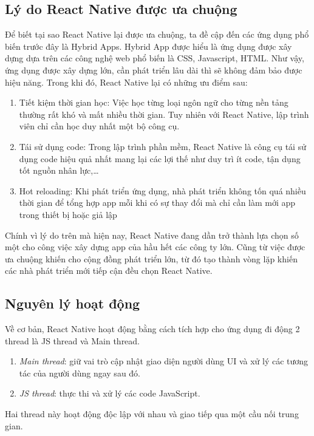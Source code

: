\subsection{Lý do React Native được ưa chuộng}
Để biết tại sao React Native lại được ưa chuộng, ta đề cập đến các ứng dụng phổ biến trước đây là Hybrid Apps. Hybrid App được hiểu là ứng dụng được xây dựng dựa trên các công nghệ web phổ biến là CSS, Javascript, HTML. Như vậy, ứng dụng được xây dựng lớn, cần phát triển lâu dài thì sẽ không đảm bảo được hiệu năng.
\newline
Trong khi đó, React Native lại có những ưu điểm sau:
\begin{enumerate}
    \item {Tiết kiệm thời gian học:} Việc học từng loại ngôn ngữ cho từng nền tảng thường rất khó và mất nhiều thời gian. Tuy nhiên với React Native, lập trình viên chỉ cần học duy nhất một bộ công cụ.
    \item {Tái sử dụng code:} Trong lập trình phần mềm, React Native là công cụ tái sử dụng code hiệu quả nhất mang lại các lợi thế như duy trì ít code, tận dụng tốt nguồn nhân lực,\dots
    \item {Hot reloading:} Khi phát triển ứng dụng, nhà phát triển không tốn quá nhiều thời gian để tổng hợp app mỗi khi có sự thay đổi mà chỉ cần làm mới app trong thiết bị hoặc giả lập
\end{enumerate}
Chính vì lý do trên mà hiện nay, React Native  đang dần trở thành lựa chọn số một cho công việc xây dựng app của hầu hết các công ty lớn. Cũng từ việc được ưa chuộng khiến cho cộng đồng phát triển lớn, từ đó tạo thành vòng lặp khiến các nhà phát triển mới tiếp cận đều chọn React Native.

\subsection{Nguyên lý hoạt động}
Về cơ bản, React Native hoạt động bằng cách tích hợp cho ứng dụng đi động 2 thread là JS thread và Main thread.
\begin{enumerate}
    \item{\textit{Main thread}}: giữ vai trò cập nhật giao diện người dùng UI và xử lý các tương tác của người dùng ngay sau đó.
    \item{\textit{JS thread}}: thực thi và xử lý các code JavaScript.
\end{enumerate}
Hai thread này hoạt động độc lập với nhau và giao tiếp qua một cầu nối trung gian.

